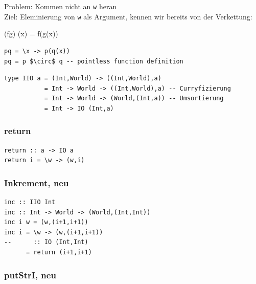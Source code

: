 			Problem: Kommen nicht an \texttt{w} heran\\
			Ziel: Eleminierung von \texttt{w} als Argument, kennen wir bereits von der Verkettung:

			\begin{flalign*}
(f\circ g) (x) = f(g(x))
			\end{flalign*}

			\begin{lstlisting}[mathescape]
pq = \x -> p(q(x))
pq = p $\circ$ q -- pointless function definition
			\end{lstlisting}

			\lstHaskell[Umbauen]
			\begin{lstlisting}
type IIO a = (Int,World) -> ((Int,World),a)
           = Int -> World -> ((Int,World),a) -- Curryfizierung
           = Int -> World -> (World,(Int,a)) -- Umsortierung
           = Int -> IO (Int,a)
			\end{lstlisting}
		

		\subsubsection{return} %
		\label{ssub:return}

			\lstHaskell
			\begin{lstlisting}
return :: a -> IO a
return i = \w -> (w,i)
			\end{lstlisting}
		

		\subsubsection{Inkrement, neu} %
		\label{ssub:inkrement_neu}
		
			\lstHaskell
			\begin{lstlisting}
inc :: IIO Int
inc :: Int -> World -> (World,(Int,Int))
inc i w = (w,(i+1,i+1))
inc i = \w -> (w,(i+1,i+1))
--      :: IO (Int,Int)
      = return (i+1,i+1)
			\end{lstlisting}


		\subsubsection{putStrI, neu} %
		\label{ssub:putstri_neu}
		
